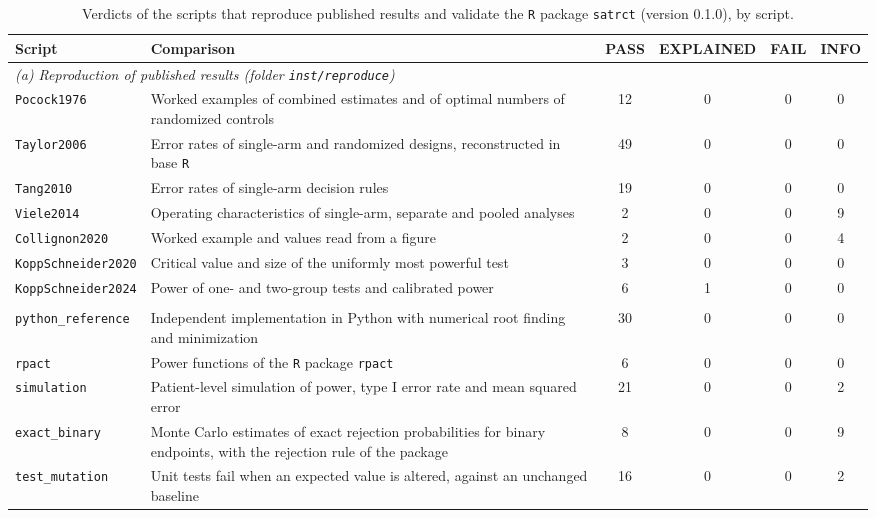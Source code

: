 \begin{table}[!htb]
\centering
\small
\caption{Verdicts of the scripts that reproduce published results and validate the \texttt{R} package \texttt{satrct} (version 0.1.0), by script.}
\label{tab:validation}
\footnotesize
\setlength{\tabcolsep}{4pt}
\begin{tabular}{lp{6.4cm}cccc}
\toprule
Script & Comparison & PASS & EXPLAINED & FAIL & INFO \tabularnewline
\midrule
\multicolumn{6}{l}{\textit{(a) Reproduction of published results (folder \texttt{inst/reproduce})}} \tabularnewline
\texttt{Pocock1976} & \raggedright Worked examples of combined estimates and of optimal numbers of randomized controls~\cite{Pocock1976} & 12 & 0 & 0 & 0 \tabularnewline
\texttt{Taylor2006} & \raggedright Error rates of single-arm and randomized designs, reconstructed in base \texttt{R}~\cite{Taylor2006} & 49 & 0 & 0 & 0 \tabularnewline
\texttt{Tang2010} & \raggedright Error rates of single-arm decision rules~\cite{Tang2010} & 19 & 0 & 0 & 0 \tabularnewline
\texttt{Viele2014} & \raggedright Operating characteristics of single-arm, separate and pooled analyses~\cite{Viele2014} & 2 & 0 & 0 & 9 \tabularnewline
\texttt{Collignon2020} & \raggedright Worked example and values read from a figure~\cite{Collignon2020} & 2 & 0 & 0 & 4 \tabularnewline
\texttt{KoppSchneider2020} & \raggedright Critical value and size of the uniformly most powerful test~\cite{KoppSchneider2020} & 3 & 0 & 0 & 0 \tabularnewline
\texttt{KoppSchneider2024} & \raggedright Power of one- and two-group tests and calibrated power~\cite{KoppSchneider2024} & 6 & 1 & 0 & 0 \tabularnewline
\addlinespace
\multicolumn{6}{l}{\textit{(b) Validation (folder \texttt{inst/validation})}} \tabularnewline
\texttt{python\_reference} & \raggedright Independent implementation in Python with numerical root finding and minimization & 30 & 0 & 0 & 0 \tabularnewline
\texttt{rpact} & \raggedright Power functions of the \texttt{R} package \texttt{rpact}~\cite{rpact2026} & 6 & 0 & 0 & 0 \tabularnewline
\texttt{simulation} & \raggedright Patient-level simulation of power, type I error rate and mean squared error & 21 & 0 & 0 & 2 \tabularnewline
\texttt{exact\_binary} & \raggedright Monte Carlo estimates of exact rejection probabilities for binary endpoints, with the rejection rule of the package & 8 & 0 & 0 & 9 \tabularnewline
\texttt{test\_mutation} & \raggedright Unit tests fail when an expected value is altered, against an unchanged baseline & 16 & 0 & 0 & 2 \tabularnewline
\bottomrule
\end{tabular}
\par\smallskip

\end{table}
